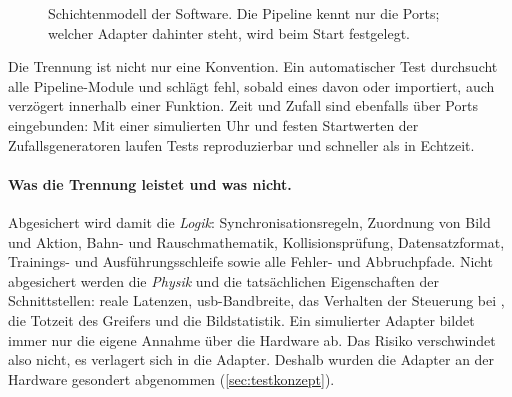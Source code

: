\begin{figure}[htbp]
  \centering
  \caption[Schichtenmodell der Software]{Schichtenmodell der Software. Die Pipeline kennt
  nur die Ports; welcher Adapter dahinter steht, wird beim Start festgelegt.}
  \label{fig:schichten}
\end{figure}

Die Trennung ist nicht nur eine Konvention. Ein automatischer Test durchsucht alle
Pipeline-Module und schlägt fehl, sobald eines davon  oder 
importiert, auch verzögert innerhalb einer Funktion. Zeit und Zufall sind ebenfalls über
Ports eingebunden: Mit einer simulierten Uhr und festen Startwerten der Zufallsgeneratoren
laufen Tests reproduzierbar und schneller als in Echtzeit.

\paragraph{Was die Trennung leistet und was nicht.}
Abgesichert wird damit die \emph{Logik}: Synchronisationsregeln, Zuordnung von Bild und
Aktion, Bahn- und Rauschmathematik, Kollisionsprüfung, Datensatzformat, Trainings- und
Ausführungsschleife sowie alle Fehler- und Abbruchpfade. Nicht abgesichert werden die
\emph{Physik} und die tatsächlichen Eigenschaften der Schnittstellen: reale Latenzen,
\acs{usb}-Bandbreite, das Verhalten der Steuerung bei , die Totzeit des
Greifers und die Bildstatistik. Ein simulierter Adapter bildet immer nur die eigene Annahme
über die Hardware ab. Das Risiko verschwindet also nicht, es verlagert sich in die Adapter.
Deshalb wurden die Adapter an der Hardware gesondert abgenommen (\cref{sec:testkonzept}).

